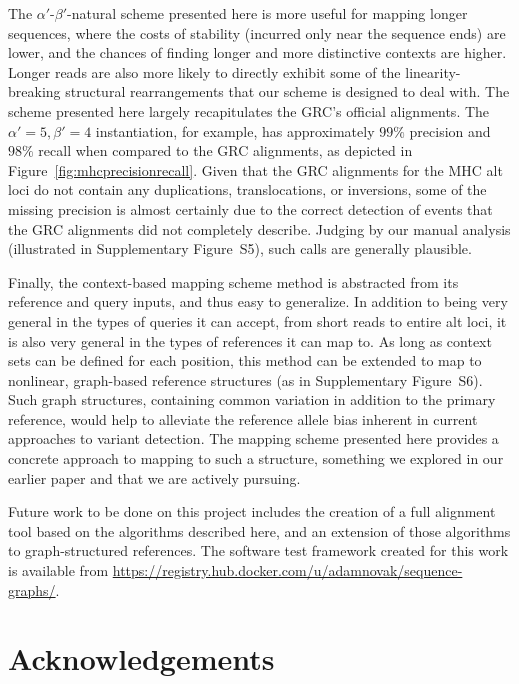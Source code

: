 
The $\alpha'$-$\beta'$-natural scheme presented here is more useful for mapping longer sequences, where the costs of stability (incurred only near the sequence ends) are lower, and the chances of finding longer and more distinctive contexts are higher. Longer reads are also more likely to directly exhibit some of the linearity-breaking structural rearrangements that our scheme is designed to deal with. The scheme presented here largely recapitulates the GRC's official alignments. The $\alpha' = 5, \beta' = 4$ instantiation, for example, has approximately $99\%$ precision and $98\%$ recall when compared to the GRC alignments, as depicted in Figure~\ref{fig:mhcprecisionrecall}. Given that the GRC alignments for the MHC alt loci do not contain any duplications, translocations, or inversions, some of the missing precision is almost certainly due to the correct detection of events that the GRC alignments did not completely describe. Judging by our manual analysis (illustrated in Supplementary Figure~S5), such calls are generally plausible. 

Finally, the context-based mapping scheme method is abstracted from its reference and query inputs, and thus easy to generalize. In addition to being very general in the types of queries it can accept, from short reads to entire alt loci, it is also very general in the types of references it can map to. As long as context sets can be defined for each position, this method can be extended to map to nonlinear, graph-based reference structures (as in Supplementary Figure~S6). Such graph structures, containing common variation in addition to the primary reference, would help to alleviate the reference allele bias inherent in current approaches to variant detection. The mapping scheme presented here provides a concrete approach to mapping to such a structure, something we explored in our earlier paper \citep{paten2014mapping} and that we are actively pursuing. 

Future work to be done on this project includes the creation of a full alignment tool based on the algorithms described here, and an extension of those algorithms to graph-structured references. The software test framework created for this work is available from \url{https://registry.hub.docker.com/u/adamnovak/sequence-graphs/}.

\section*{Acknowledgements}

